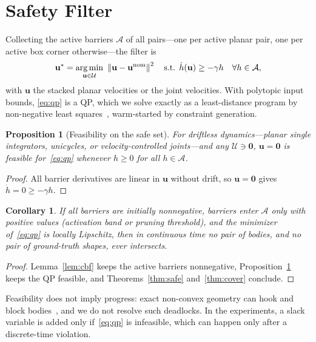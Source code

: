 \documentclass[journal]{IEEEtran}
\newtheorem{proposition}{Proposition}
\newtheorem{corollary}{Corollary}
\theoremstyle{definition}
\newcommand{\norm}[1]{\left\lVert #1\right\rVert}
\DeclareMathOperator*{\argmin}{arg\,min}
\begin{document}
\section{Safety Filter}\label{sec:filter}
Collecting the active barriers $\mathcal A$ of all pairs---one per active planar pair, one per active
box corner otherwise---the filter is
\begin{equation}\label{eq:qp}
\mathbf u^\ast=\argmin_{\mathbf u\in\mathcal U}\ \norm{\mathbf u-\mathbf u^{\rm nom}}^2
\quad\text{s.t. }\dot h(\mathbf u)\ge-\gamma h\quad\forall h\in\mathcal A,
\end{equation}
with $\mathbf u$ the stacked planar velocities or the joint velocities. With polytopic input bounds,
\eqref{eq:qp} is a QP, which we solve exactly as a least-distance program by non-negative least
squares~\cite{lawson1995solving}, warm-started by constraint generation.
\begin{proposition}[Feasibility on the safe set]\label{prop:feas}
For driftless dynamics---planar single integrators, unicycles, or velocity-controlled joints---and
any $\mathcal U\ni\mathbf 0$, $\mathbf u=\mathbf 0$ is feasible for~\eqref{eq:qp} whenever
$h\ge0$ for all $h\in\mathcal A$.
\end{proposition}
\begin{proof}
All barrier derivatives are linear in $\mathbf u$ without drift, so $\mathbf u=\mathbf 0$ gives
$\dot h=0\ge-\gamma h$.
\end{proof}
\begin{corollary}\label{cor:closed}
If all barriers are initially nonnegative, barriers enter $\mathcal A$ only with positive values
(activation band or pruning threshold), and the minimizer of~\eqref{eq:qp} is locally Lipschitz,
then in continuous time no pair of bodies, and no pair of ground-truth shapes, ever intersects.
\end{corollary}
\begin{proof}
Lemma~\ref{lem:cbf} keeps the active barriers nonnegative, Proposition~\ref{prop:feas} keeps the QP
feasible, and Theorems~\ref{thm:safe} and~\ref{thm:cover} conclude.
\end{proof}
Feasibility does not imply progress: exact non-convex geometry can hook and block
bodies~\cite{reis2020undesirable}, and we do not resolve such deadlocks. In the experiments, a slack
variable is added only if~\eqref{eq:qp} is infeasible, which can happen only after a discrete-time
violation.

\end{document}
